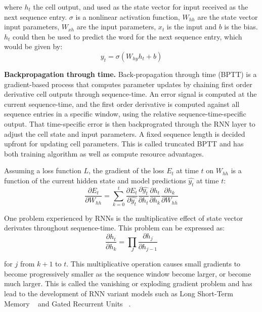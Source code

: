 \noindent where $h_t$ the cell output, and used as the state vector for input received as the next sequence entry. $\sigma$ is a nonlinear activation function, $W_{hh}$ are the state vector input parameters, $W_{xh}$ are the input parameters, $x_t$ is the input and $b$ is the bias. $h_t$ could then be used to predict the word for the next sequence entry, which would be given by:
\begin{equation}
	y_t = \sigma(W_{hy}h_{t} + b)
\end{equation}

\noindent \textbf{Backpropagation through time.} Back-propagation through time (BPTT) is a gradient-based process that computes parameter updates by chaining first order derivative cell outputs through sequence-time. An error signal is computed at the current sequence-time, and the first order derivative is computed against all sequence entries in a specific window, using the relative sequence-time-specific output. That time-specific error is then backprograted through the RNN layer to adjust the cell state and input parameters. A fixed sequence length is decided upfront for updating cell parameters. This is called truncated BPTT and has both training algorithm as well as compute resource advantages. \par

\noindent Assuming a loss function $L$, the gradient of the loss $E_t$ at time $t$ on $W_{hh}$ is a function of the current hidden state and model predictions $\hat{y_t}$ at time $t$:  
\begin{equation}
	\frac{\partial E_t} {\partial W_{hh}} = \sum_{k=0}^{t}\frac{\partial E_t} {\partial \hat{y_t}}\frac{\partial \hat{y_t}} {\partial h_t}\frac{\partial h_t} {\partial h_k}\frac{\partial h_k} {\partial W_{hh}}
\end{equation}

\noindent One problem experienced by RNNs is the multiplicative effect of state vector derivates throughout sequence-time. This problem can be expressed as:
\begin{equation}
	\frac{\partial h_t} {\partial h_k} = \prod_J\frac{\partial h_j} {\partial h_{j-1}}
\end{equation}

\noindent for $j$ from $k + 1$ to $t$. This multiplicative operation causes small gradients to become progressively smaller as the sequence window become larger, or become much larger. This is called the vanishing or exploding gradient problem and has lead to the development of RNN variant models such as Long Short-Term Memory \unskip ~\citep{hochreiter1997long} and Gated Recurrent Units \unskip ~\citep{cho2014learning}.



